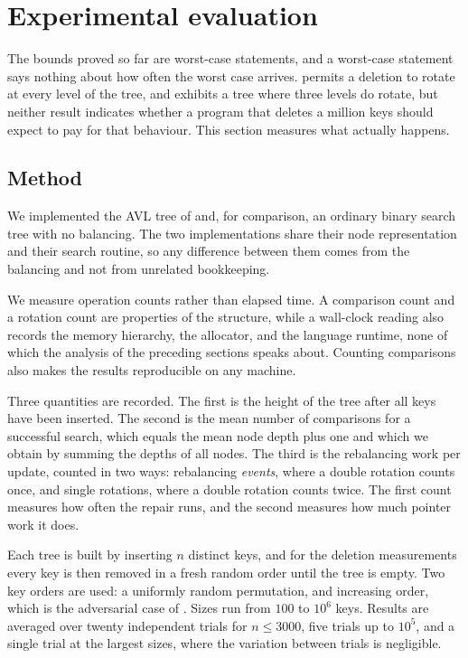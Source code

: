 \section{Experimental evaluation}
\label{sec:eval}

The bounds proved so far are worst-case statements, and a worst-case statement
says nothing about how often the worst case arrives. 
permits a deletion to rotate at every level of the tree, and 
exhibits a tree where three levels do rotate, but neither result indicates
whether a program that deletes a million keys should expect to pay for that
behaviour. This section measures what actually happens.

\subsection{Method}

We implemented the AVL tree of 
and, for comparison, an ordinary binary search tree with no balancing. The two
implementations share their node representation and their search routine, so any
difference between them comes from the balancing and not from unrelated
bookkeeping.

We measure operation counts rather than elapsed time. A comparison count and a
rotation count are properties of the structure, while a wall-clock reading also
records the memory hierarchy, the allocator, and the language runtime, none of
which the analysis of the preceding sections speaks about. Counting comparisons
also makes the results reproducible on any machine.

Three quantities are recorded. The first is the height of the tree after all keys
have been inserted. The second is the mean number of comparisons for a successful
search, which equals the mean node depth plus one and which we obtain by summing
the depths of all nodes. The third is the rebalancing work per update, counted in
two ways: rebalancing \emph{events}, where a double rotation counts once, and
single rotations, where a double rotation counts twice. The first count measures
how often the repair runs, and the second measures how much pointer work it does.

Each tree is built by inserting $n$ distinct keys, and for the deletion
measurements every key is then removed in a fresh random order until the tree is
empty. Two key orders are used: a uniformly random permutation, and increasing
order, which is the adversarial case of . Sizes run from
$100$ to $10^{6}$ keys. Results are averaged over twenty independent trials for
$n \le 3000$, five trials up to $10^{5}$, and a single trial at the largest
sizes, where the variation between trials is negligible.

